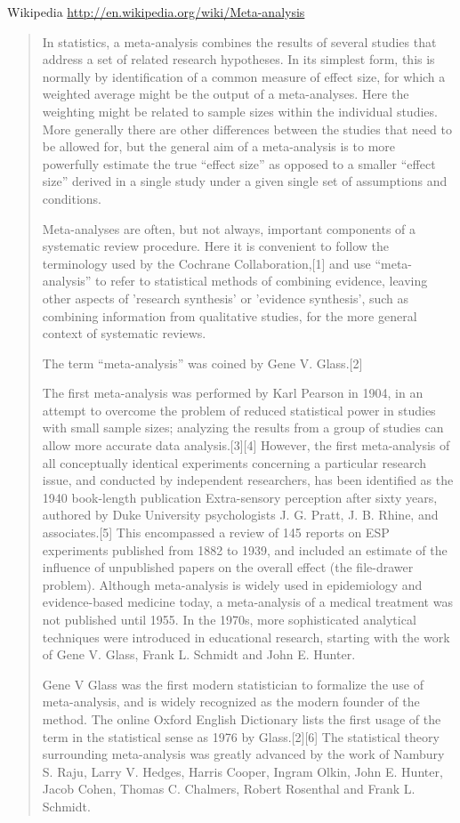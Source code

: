 Wikipedia \url{http://en.wikipedia.org/wiki/Meta-analysis}
\begin{quote}
In statistics, a meta-analysis combines the results of several studies
that address a set of related research hypotheses. In its simplest
form, this is normally by identification of a common measure of effect
size, for which a weighted average might be the output of a
meta-analyses. Here the weighting might be related to sample sizes
within the individual studies. More generally there are other
differences between the studies that need to be allowed for, but the
general aim of a meta-analysis is to more powerfully estimate the true
``effect size'' as opposed to a smaller ``effect size'' derived in a
single study under a given single set of assumptions and conditions.

Meta-analyses are often, but not always, important components of a
systematic review procedure. Here it is convenient to follow the
terminology used by the Cochrane Collaboration,[1] and use
``meta-analysis'' to refer to statistical methods of combining
evidence, leaving other aspects of 'research synthesis' or 'evidence
synthesis', such as combining information from qualitative studies,
for the more general context of systematic reviews.

The term ``meta-analysis'' was coined by Gene V. Glass.[2]

The first meta-analysis was performed by Karl Pearson in 1904, in an
attempt to overcome the problem of reduced statistical power in
studies with small sample sizes; analyzing the results from a group of
studies can allow more accurate data analysis.[3][4] However, the
first meta-analysis of all conceptually identical experiments
concerning a particular research issue, and conducted by independent
researchers, has been identified as the 1940 book-length publication
Extra-sensory perception after sixty years, authored by Duke
University psychologists J. G. Pratt, J. B. Rhine, and associates.[5]
This encompassed a review of 145 reports on ESP experiments published
from 1882 to 1939, and included an estimate of the influence of
unpublished papers on the overall effect (the file-drawer
problem). Although meta-analysis is widely used in epidemiology and
evidence-based medicine today, a meta-analysis of a medical treatment
was not published until 1955. In the 1970s, more sophisticated
analytical techniques were introduced in educational research,
starting with the work of Gene V. Glass, Frank L. Schmidt and John
E. Hunter.

Gene V Glass was the first modern statistician to formalize the use of
meta-analysis, and is widely recognized as the modern founder of the
method. The online Oxford English Dictionary lists the first usage of
the term in the statistical sense as 1976 by Glass.[2][6] The
statistical theory surrounding meta-analysis was greatly advanced by
the work of Nambury S. Raju, Larry V. Hedges, Harris Cooper, Ingram
Olkin, John E. Hunter, Jacob Cohen, Thomas C. Chalmers, Robert
Rosenthal and Frank L. Schmidt.

\end{quote}

